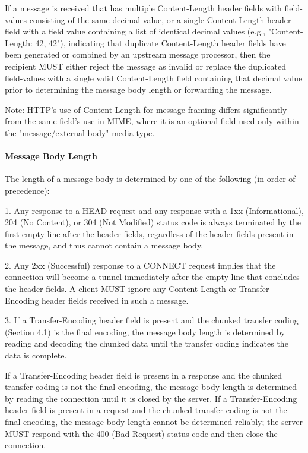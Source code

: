    If a message is received that has multiple Content-Length header
   fields with field-values consisting of the same decimal value, or a
   single Content-Length header field with a field value containing a
   list of identical decimal values (e.g., "Content-Length: 42, 42"),
   indicating that duplicate Content-Length header fields have been
   generated or combined by an upstream message processor, then the
   recipient MUST either reject the message as invalid or replace the
   duplicated field-values with a single valid Content-Length field
   containing that decimal value prior to determining the message body
   length or forwarding the message.

      Note: HTTP's use of Content-Length for message framing differs
      significantly from the same field's use in MIME, where it is an
      optional field used only within the "message/external-body"
      media-type.

\paragraph{Message Body Length }
The length of a message body is determined by one of the following
(in order of precedence):

1.  Any response to a HEAD request and any response with a 1xx
    (Informational), 204 (No Content), or 304 (Not Modified) status
    code is always terminated by the first empty line after the
    header fields, regardless of the header fields present in the
    message, and thus cannot contain a message body.

2.  Any 2xx (Successful) response to a CONNECT request implies that
    the connection will become a tunnel immediately after the empty
    line that concludes the header fields.  A client MUST ignore any
    Content-Length or Transfer-Encoding header fields received in
    such a message.

3.  If a Transfer-Encoding header field is present and the chunked
    transfer coding (Section 4.1) is the final encoding, the message
    body length is determined by reading and decoding the chunked
    data until the transfer coding indicates the data is complete.

    If a Transfer-Encoding header field is present in a response and
    the chunked transfer coding is not the final encoding, the
    message body length is determined by reading the connection until
    it is closed by the server.  If a Transfer-Encoding header field
    is present in a request and the chunked transfer coding is not
    the final encoding, the message body length cannot be determined
    reliably; the server MUST respond with the 400 (Bad Request)
    status code and then close the connection.

